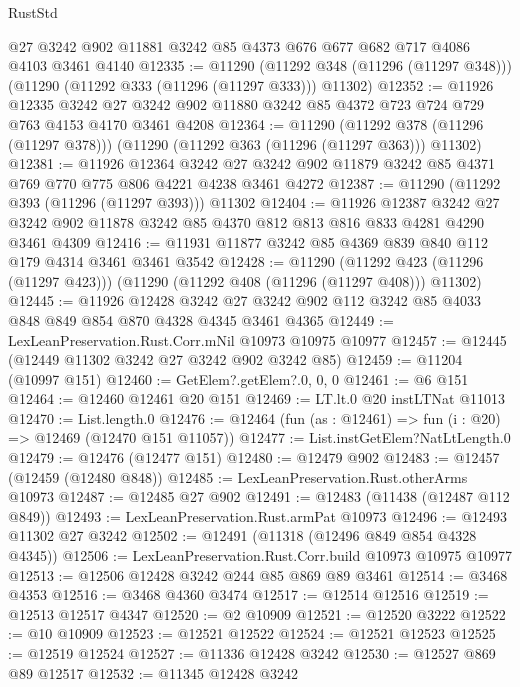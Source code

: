 \begin{lexlean}{RustStd}
\begin{coremodule}
    @27
    @3242
    @902
    @11881
    @3242
    @85
    @4373
    @676
    @677
    @682
    @717
    @4086
    @4103
    @3461
    @4140
@12335 := @11290
    (@11292 @348 (@11296 (@11297 @348)))
    (@11290 (@11292 @333 (@11296 (@11297 @333))) @11302)
@12352 := @11926
    @12335
    @3242
    @27
    @3242
    @902
    @11880
    @3242
    @85
    @4372
    @723
    @724
    @729
    @763
    @4153
    @4170
    @3461
    @4208
@12364 := @11290
    (@11292 @378 (@11296 (@11297 @378)))
    (@11290 (@11292 @363 (@11296 (@11297 @363))) @11302)
@12381 := @11926
    @12364
    @3242
    @27
    @3242
    @902
    @11879
    @3242
    @85
    @4371
    @769
    @770
    @775
    @806
    @4221
    @4238
    @3461
    @4272
@12387 := @11290 (@11292 @393 (@11296 (@11297 @393))) @11302
@12404 := @11926
    @12387
    @3242
    @27
    @3242
    @902
    @11878
    @3242
    @85
    @4370
    @812
    @813
    @816
    @833
    @4281
    @4290
    @3461
    @4309
@12416 := @11931 @11877 @3242 @85 @4369 @839 @840 @112 @179 @4314 @3461 @3461 @3542
@12428 := @11290
    (@11292 @423 (@11296 (@11297 @423)))
    (@11290 (@11292 @408 (@11296 (@11297 @408))) @11302)
@12445 := @11926
    @12428
    @3242
    @27
    @3242
    @902
    @112
    @3242
    @85
    @4033
    @848
    @849
    @854
    @870
    @4328
    @4345
    @3461
    @4365
@12449 := LexLeanPreservation.Rust.Corr.mNil @10973 @10975 @10977
@12457 := @12445 (@12449 @11302 @3242 @27 @3242 @902 @3242 @85)
@12459 := @11204 (@10997 @151)
@12460 := GetElem?.getElem?.{0, 0, 0}
@12461 := @6 @151
@12464 := @12460 @12461 @20 @151
@12469 := LT.lt.{0} @20 instLTNat @11013
@12470 := List.length.{0}
@12476 := @12464 (fun (as : @12461) => fun (i : @20) => @12469 (@12470 @151 @11057))
@12477 := List.instGetElem?NatLtLength.{0}
@12479 := @12476 (@12477 @151)
@12480 := @12479 @902
@12483 := @12457 (@12459 (@12480 @848))
@12485 := LexLeanPreservation.Rust.otherArms @10973
@12487 := @12485 @27 @902
@12491 := @12483 (@11438 (@12487 @112 @849))
@12493 := LexLeanPreservation.Rust.armPat @10973
@12496 := @12493 @11302 @27 @3242
@12502 := @12491 (@11318 (@12496 @849 @854 @4328 @4345))
@12506 := LexLeanPreservation.Rust.Corr.build @10973 @10975 @10977
@12513 := @12506 @12428 @3242 @244 @85 @869 @89 @3461
@12514 := @3468 @4353
@12516 := @3468 @4360 @3474
@12517 := @12514 @12516
@12519 := @12513 @12517 @4347
@12520 := @2 @10909
@12521 := @12520 @3222
@12522 := @10 @10909
@12523 := @12521 @12522
@12524 := @12521 @12523
@12525 := @12519 @12524
@12527 := @11336 @12428 @3242
@12530 := @12527 @869 @89 @12517
@12532 := @11345 @12428 @3242

\end{coremodule}
\end{lexlean}
